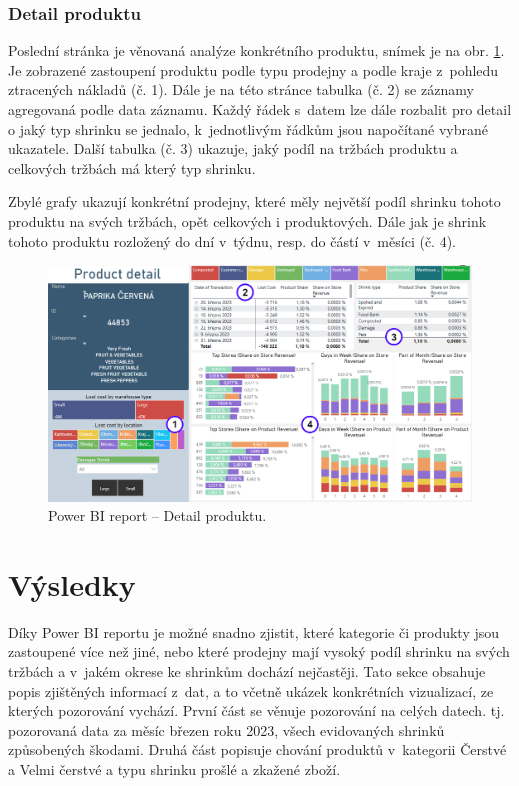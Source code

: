 \subsubsection*{Detail produktu}

Poslední stránka je věnovaná analýze konkrétního produktu, snímek je na obr. \ref*{obr:PBI:detail}. Je zobrazené zastoupení produktu podle typu prodejny a podle kraje z~pohledu ztracených nákladů (č. 1). Dále je na této stránce tabulka (č. 2) se záznamy agregovaná podle data záznamu. Každý řádek s~datem lze dále rozbalit pro detail o jaký typ shrinku se jednalo, k~jednotlivým řádkům jsou napočítané vybrané ukazatele. Další tabulka (č. 3) ukazuje, jaký podíl na tržbách produktu a celkových tržbách má který typ shrinku. 

Zbylé grafy ukazují konkrétní prodejny, které měly největší podíl shrinku tohoto produktu na svých tržbách, opět celkových i produktových. Dále jak je shrink tohoto produktu rozložený do dní v~týdnu, resp. do částí v~měsíci (č. 4).

\begin{figure}[h!]
    \centering
    \captionsetup{justification=centering}
    \includegraphics[width=\textwidth]{obrazky/PBI/productdetail.png}
    \caption{Power BI report -- Detail produktu.}
    \label{obr:PBI:detail}
\end{figure}

\section{Výsledky}
\label{sec:vizualizace:vysl}

Díky Power BI reportu je možné snadno zjistit, které kategorie či produkty jsou zastoupené více než jiné, nebo které prodejny mají vysoký podíl shrinku na svých tržbách a v~jakém okrese ke shrinkům dochází nejčastěji. Tato sekce obsahuje popis zjištěných informací z~dat, a to včetně ukázek konkrétních vizualizací, ze kterých pozorování vychází.
První část se věnuje pozorování na celých datech. tj. pozorovaná data za měsíc březen roku 2023, všech evidovaných shrinků způsobených škodami. Druhá část popisuje chování produktů v~kategorii Čerstvé a Velmi čerstvé a typu shrinku prošlé a zkažené zboží.

